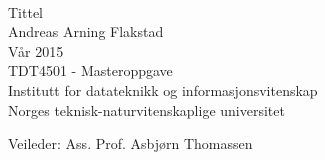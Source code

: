 \thispagestyle{empty}
\mbox{}\\[6pc]
\begin{center}
\Huge{Tittel}\\[2pc]

\Large{Andreas Arning Flakstad}\\[1pc]
\large{Vår 2015}\\[2pc]

TDT4501 - Masteroppgave\\
Institutt for datateknikk og informasjonsvitenskap\\
Norges teknisk-naturvitenskaplige universitet
\end{center}
\vfill

\noindent Veileder: Ass. Prof. Asbjørn Thomassen


